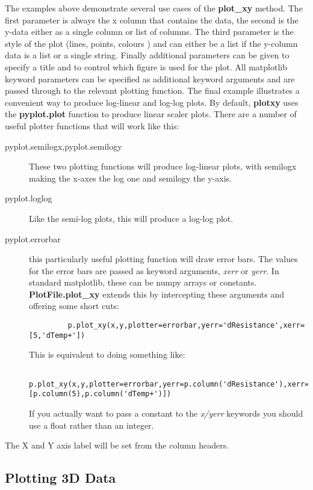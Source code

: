 \documentclass[a4paper,11pt]{scrartcl}
\begin{document}
The examples above demonstrate several use cases of the \textbf{plot\_xy} method. The first parameter is always the x column that contains the data, the second is the y-data either as a single column or list of columns. The third parameter is the style of the plot (lines, points, colours \etc) and can either be a list if the y-column data is a list or a single string. Finally additional parameters can be given to specify a title and to control which figure is used for the plot. All matplotlib keyword parameters can be specified as additional keyword arguments and are passed through to the relevant plotting function. The final example illustrates a convenient way to produce log-linear and log-log plots. By default, \textbf{plotxy} uses the \textbf{pyplot.plot} function to produce linear scaler plots. There are a number of useful plotter functions that will work like this:
\begin{description}
  \item[pyplot.semilogx,pyplot.semilogy] These two plotting functions will produce log-linear plots, with semilogx making the x-axes the log one and semilogy the y-axis.
  \item[pyplot.loglog] Like the semi-log plots, this will produce a log-log plot.
  \item[pyplot.errorbar] this particularly useful plotting function will draw error bars. The values for the error bars are passed as keyword arguments, \textit{xerr} or \textit{yerr}. In standard matplotlib, these can be numpy arrays or constants. \textbf{PlotFile.plot\_xy} extends this by intercepting these arguments and offering some short cuts:
      \begin{lstlisting}
         p.plot_xy(x,y,plotter=errorbar,yerr='dResistance',xerr=[5,'dTemp+'])
      \end{lstlisting}
      This is equivalent to doing something like:
       \begin{lstlisting}
         p.plot_xy(x,y,plotter=errorbar,yerr=p.column('dResistance'),xerr=[p.column(5),p.column('dTemp+')])
      \end{lstlisting}
    If you actually want to pass a constant to the \textit{x/yerr} keywords you should use a float rather than an integer.
\end{description}

The X and Y axis label will be set from the column headers.

\subsection{Plotting 3D Data}
\end{document}
